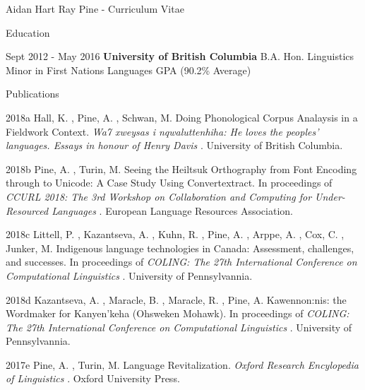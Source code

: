 \documentclass[12pt]{letter}
\date{}
\begin{document}
        \begin{cv}{ Aidan Hart Ray Pine  \space - \space   Curriculum Vitae}
        \vspace{1mm}

                    \begin{cvlist}{Education}
                \item[Sept 2012 - May 2016] \textbf{University of British Columbia}
            \newline B.A. Hon. Linguistics
            \newline Minor in First Nations Languages
             GPA (90.2\% Average)
            \end{cvlist}
        
        
        \begin{cvlist}{Publications}
                                                \item[2018a]  Hall,  K. ,  Pine,  A. ,  Schwan,  M.   Doing Phonological Corpus Analaysis in a Fieldwork Context. \textit{ Wa7 xweysas i nqwaluttenhiha: He loves the peoples' languages. Essays in honour of Henry Davis }. University of British Columbia.  
                                                            \item[2018b]  Pine,  A. ,  Turin,  M.   Seeing the Heiltsuk Orthography from Font Encoding through to Unicode: A Case Study Using Convertextract. In proceedings of \textit{ CCURL 2018: The 3rd Workshop on Collaboration and Computing for Under-Resourced Languages }. European Language Resources Association.  
                                                            \item[2018c]  Littell,  P. ,  Kazantseva,  A. ,  Kuhn,  R. ,  Pine,  A. ,  Arppe,  A. ,  Cox,  C. ,  Junker,  M.   Indigenous language technologies in Canada: Assessment, challenges, and successes. In proceedings of \textit{ COLING: The 27th International Conference on Computational Linguistics }. University of Pennsylvannia.  
                                                            \item[2018d]  Kazantseva,  A. ,  Maracle,  B. ,  Maracle,  R. ,  Pine,  A.   Kawennon:nis: the Wordmaker for Kanyen'keha (Ohsweken Mohawk). In proceedings of \textit{ COLING: The 27th International Conference on Computational Linguistics }. University of Pennsylvannia.  
                                                            \item[2017e]  Pine,  A. ,  Turin,  M.   Language Revitalization. \textit{ Oxford Research Encylopedia of Linguistics }. Oxford University Press.  

\end{cvlist}
\end{cv}
\end{document}

